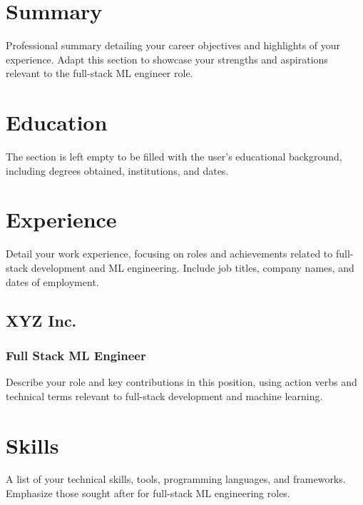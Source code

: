 \documentclass{resume}
\begin{document}
\maketitle

\section{Summary}
Professional summary detailing your career objectives and highlights of your experience. Adapt this section to showcase your strengths and aspirations relevant to the full-stack ML engineer role.

\section{Education}
The section is left empty to be filled with the user's educational background, including degrees obtained, institutions, and dates.

\section{Experience}
Detail your work experience, focusing on roles and achievements related to full-stack development and ML engineering. Include job titles, company names, and dates of employment.

\subsection{XYZ Inc.}
\subsubsection{Full Stack ML Engineer}
Describe your role and key contributions in this position, using action verbs and technical terms relevant to full-stack development and machine learning.

\section{Skills}
A list of your technical skills, tools, programming languages, and frameworks. Emphasize those sought after for full-stack ML engineering roles.
\end{document}
